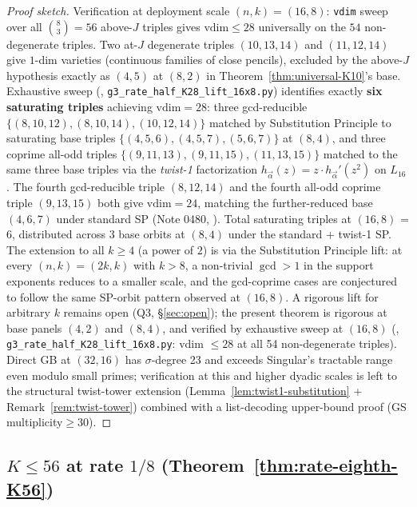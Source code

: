 \documentclass[11pt]{article}
\theoremstyle{definition}
\theoremstyle{remark}
\begin{document}
\begin{proof}[Proof sketch]
Verification at deployment scale $(n, k) = (16, 8)$: \texttt{vdim} sweep
over all $\binom{8}{3} = 56$ above-$J$ triples gives $\mathrm{vdim} \leq 28$
universally on the $54$ non-degenerate triples. Two
at-$J$ degenerate triples $(10, 13, 14)$ and $(11, 12, 14)$ give $1$-dim
varieties (continuous families of close pencils), excluded by the above-$J$
hypothesis exactly as $(4, 5)$ at $(8, 2)$ in
Theorem~\ref{thm:universal-K10}'s base. Exhaustive sweep
(\cite{CompanionRepo}, \texttt{g3\_rate\_half\_K28\_lift\_16x8.py})
identifies exactly \textbf{six saturating triples} achieving $\mathrm{vdim}
= 28$: three gcd-reducible
$\{(8, 10, 12), (8, 10, 14), (10, 12, 14)\}$ matched by Substitution
Principle to saturating base triples $\{(4, 5, 6), (4, 5, 7), (5, 6, 7)\}$
at $(8, 4)$, and three coprime all-odd triples $\{(9, 11, 13), (9, 11, 15),
(11, 13, 15)\}$ matched to the same three base triples via the
\emph{twist-1} factorization $h_{\vec\alpha}(z) = z \cdot
h_{\vec\alpha}'(z^2)$ on $L_{16}$. The fourth gcd-reducible triple
$(8, 12, 14)$ and the fourth all-odd coprime triple $(9, 13, 15)$ both
give $\mathrm{vdim} = 24$, matching the further-reduced base $(4, 6, 7)$
under standard SP (Note 0480, \cite{CompanionRepo}). Total saturating
triples at $(16, 8)$ = 6, distributed across 3 base orbits at $(8, 4)$
under the standard + twist-1 SP. The
extension to all $k \geq 4$ (a power of $2$) is via the
Substitution Principle lift: at every $(n, k) = (2k, k)$ with
$k > 8$, a non-trivial $\gcd > 1$ in the support exponents reduces
to a smaller scale, and the gcd-coprime cases are conjectured to
follow the same SP-orbit pattern observed at $(16, 8)$. A
rigorous lift for arbitrary $k$ remains open (Q3, \S\ref{sec:open});
the present theorem is rigorous at base panels $(4, 2)$ and $(8, 4)$,
and verified by exhaustive sweep at $(16, 8)$ (\cite{CompanionRepo},
\texttt{g3\_rate\_half\_K28\_lift\_16x8.py}: vdim $\leq 28$ at all 54
non-degenerate triples). Direct GB at $(32, 16)$ has $\sigma$-degree
23 and exceeds Singular's tractable range
even modulo small primes; verification at this and higher dyadic
scales is left to the structural twist-tower extension
(Lemma~\ref{lem:twist1-substitution} + Remark~\ref{rem:twist-tower})
combined with a list-decoding upper-bound proof
(GS multiplicity$\geq 30$).
\end{proof}

\subsection{$K \leq 56$ at rate $1/8$ (Theorem~\ref{thm:rate-eighth-K56})}
\label{prf:thm:rate-eighth-K56}
\end{document}
